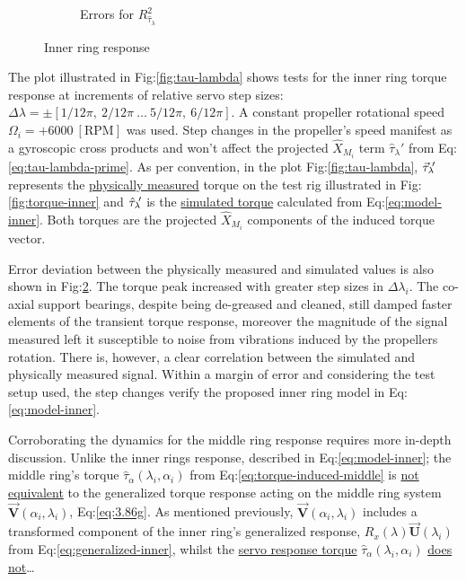 \begin{figure}[hbtp]
\begin{subfigure}{0.49\textwidth}
\caption{Errors for $R^2_{\hat{\tau}_\lambda}$}
\label{fig:tau-lambda-r}
\end{subfigure}
\vspace{-8pt}
\caption{Inner ring response}
\vspace{-10pt}
\end{figure}
\par
The plot illustrated in Fig:\ref{fig:tau-lambda} shows tests for the inner ring torque response at increments of relative servo step sizes: $\Delta\lambda=\pm[1/12\pi,~2/12\pi~\ldots~5/12\pi,~6/12\pi]$. A constant propeller rotational speed $\Omega_i=+6000~[\text{RPM}]$ was used. Step changes in the propeller's speed manifest as a gyroscopic cross products and won't affect the projected $\hat{X}_{M_i}$ term $\hat{\tau}_\lambda'$ from Eq:\ref{eq:tau-lambda-prime}. As per convention, in the plot Fig:\ref{fig:tau-lambda}, $\vec{\tau}_\lambda\text{}\hspace{-2pt}'$ represents the \underline{physically measured} torque on the test rig illustrated in Fig:\ref{fig:torque-inner} and $\hat{\tau}_\lambda\text{}\hspace{-2pt}'$ is the \underline{simulated torque} calculated from Eq:\ref{eq:model-inner}. Both torques are the projected $\hat{X}_{M_i}$ components of the induced torque vector. 
\par
Error deviation between the physically measured and simulated values is also shown in Fig:\ref{fig:tau-lambda-r}. The torque peak increased with greater step sizes in $\Delta\lambda_i$. The co-axial support bearings, despite being de-greased and cleaned, still damped faster elements of the transient torque response, moreover the magnitude of the signal measured left it susceptible to noise from vibrations induced by the propellers rotation. There is, however, a clear correlation between the simulated and physically measured signal. Within a margin of error and considering the test setup used, the step changes verify the proposed inner ring model in Eq:\ref{eq:model-inner}.
\par
Corroborating the dynamics for the middle ring response requires more in-depth discussion. Unlike the inner rings response, described in Eq:\ref{eq:model-inner}; the middle ring's torque $\hat{\tau}_\alpha(\lambda_i,\alpha_i)$ from Eq:\ref{eq:torque-induced-middle} is \underline{not equivalent} to the generalized torque response acting on the middle ring system $\vec{\mathbf{V}}(\alpha_i,\lambda_i)$, Eq:\ref{eq:3.86g}. As mentioned previously, $\vec{\mathbf{V}}(\alpha_i,\lambda_i)$ includes a transformed component of the inner ring's generalized response, $R_x(\lambda)\vec{\mathbf{U}}(\lambda_i)$ from Eq:\ref{eq:generalized-inner}, whilst the \underline{servo response torque} $\hat{\tau}_\alpha(\lambda_i,\alpha_i)$ \underline{does not}\ldots 
